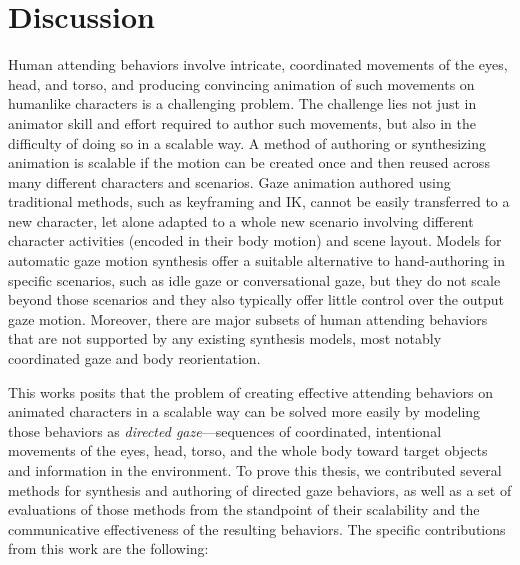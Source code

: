 \pagestyle{deposit}

\chapter{Discussion}
\label{cha:Discussion}

Human attending behaviors involve intricate, coordinated movements of the eyes, head, and torso, and producing convincing animation of such movements on humanlike characters is a challenging problem. The challenge lies not just in animator skill and effort required to author such movements, but also in the difficulty of doing so in a scalable way. A method of authoring or synthesizing animation is scalable if the motion can be created once and then reused across many different characters and scenarios. Gaze animation authored using traditional methods, such as keyframing and IK, cannot be easily transferred to a new character, let alone adapted to a whole new scenario involving different character activities (encoded in their body motion) and scene layout. Models for automatic gaze motion synthesis offer a suitable alternative to hand-authoring in specific scenarios, such as idle gaze or conversational gaze, but they do not scale beyond those scenarios and they also typically offer little control over the output gaze motion. Moreover, there are major subsets of human attending behaviors that are not supported by any existing synthesis models, most notably coordinated gaze and body reorientation.

This works posits that the problem of creating effective attending behaviors on animated characters in a scalable way can be solved more easily by modeling those behaviors as \emph{directed gaze}---sequences of coordinated, intentional movements of the eyes, head, torso, and the whole body toward target objects and information in the environment. To prove this thesis, we contributed several methods for synthesis and authoring of directed gaze behaviors, as well as a set of evaluations of those methods from the standpoint of their scalability and the communicative effectiveness of the resulting behaviors. The specific contributions from this work are the following:

